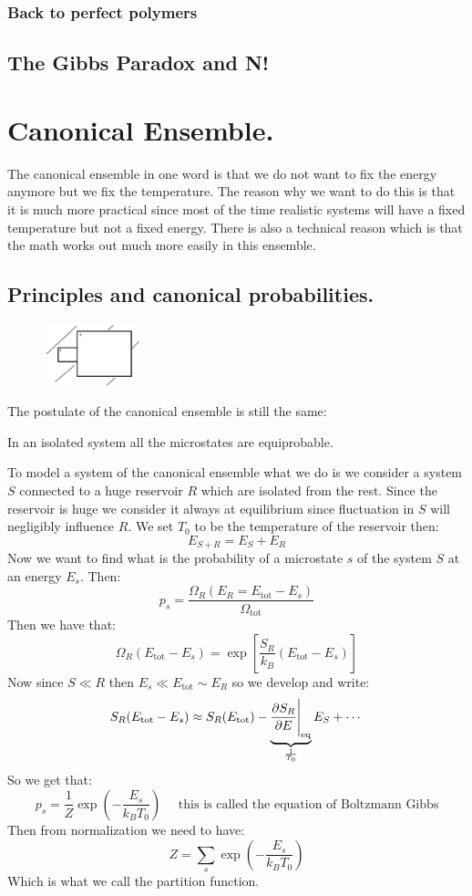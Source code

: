 \documentclass[10pt,a4paper]{book}
\begin{document}
\subsection{Back to perfect polymers}
\section{The Gibbs Paradox and N!}

\chapter{Canonical Ensemble.}
The canonical ensemble in one word is that we do not want to fix the energy anymore but we fix the temperature. The reason why we want to do this is that it is much more practical since most of the time realistic systems will have a fixed temperature but not a fixed energy. There is also a technical reason which is that the math works out much more easily in this ensemble.

\section{Principles and canonical probabilities.}
\begin{figure}
    \includegraphics[width=0.25\textwidth]{graphs/sandr}
\end{figure}
The postulate of the canonical ensemble is still the same:
\begin{center}
In an isolated system all the microstates are equiprobable.
\end{center}
To model a system of the canonical ensemble what we do is we consider a system $S$ connected to a huge reservoir $R$ which are isolated from the rest. Since the reservoir is huge we consider it always at equilibrium since fluctuation in $S$ will negligibly influence $R$. We set $T_0$ to be the temperature of the reservoir then:
\[
E_{S + R} = E_S + E_R
\]
Now we want to find what is the probability of a microstate $s$ of the system $S$ at an energy $E_s$. Then:
\[
p_s = \frac{\Omega_{R} (E_R = E_\text{tot} - E_s) }{\Omega_\text{tot}}
\]
Then we have that:
\[
\Omega_R(E_\text{tot} - E_s) = \exp \left[ \frac{S_R}{k_B}(E_\text{tot} - E_s) \right]
\]
Now since $S \ll R$ then $E_s \ll E_\text{tot} \sim E_R$ so we develop and write:
\[
S_R(E_\text{tot} - E_s) \approx S_R(E_\text{tot}) - \underbrace{\pdv{S_R}{E}\Bigg|_{\text{eq}}}_{\frac{1}{T_0}} E_S + \cdots 
\]
So we get that:
\[
p_s = \frac{1}{Z}\exp(-\frac{E_s}{k_B T_0}) \quad \text{ this is called the equation of Boltzmann Gibbs}
\]
Then from normalization we need to have:
\[
Z = \sum_s \exp(-\frac{E_s}{k_B T_0})
\]
Which is what we call the partition function.
\end{document}
